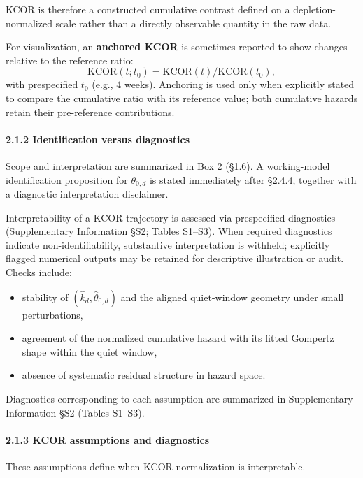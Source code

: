 \documentclass[
]{article}
\providecommand{\tightlist}{%
  \setlength{\itemsep}{0pt}\setlength{\parskip}{0pt}}
\begin{document}
KCOR is therefore a constructed cumulative contrast defined on a depletion-normalized scale rather than a directly observable quantity in the raw data.

For visualization, an \textbf{anchored KCOR} is sometimes reported to show changes relative to the reference ratio: \[\mathrm{KCOR}(t; t_0) = \mathrm{KCOR}(t)/\mathrm{KCOR}(t_0),\] with prespecified \(t_0\) (e.g., 4 weeks). Anchoring is used only when explicitly stated to compare the cumulative ratio with its reference value; both cumulative hazards retain their pre-reference contributions.

\paragraph{2.1.2 Identification versus diagnostics}\label{identification-versus-diagnostics}

Scope and interpretation are summarized in Box 2 (§1.6). A working-model identification proposition for \(\theta_{0,d}\) is stated immediately after §2.4.4, together with a diagnostic interpretation disclaimer.

Interpretability of a KCOR trajectory is assessed via prespecified diagnostics (Supplementary Information §S2; Tables S1--S3). When required diagnostics indicate non-identifiability, substantive interpretation is withheld; explicitly flagged numerical outputs may be retained for descriptive illustration or audit. Checks include:

\begin{itemize}
\tightlist
\item
  stability of \((\hat{k}_d,\hat{\theta}_{0,d})\) and the aligned quiet-window geometry under small perturbations,
\item
  agreement of the normalized cumulative hazard with its fitted Gompertz shape within the quiet window,
\item
  absence of systematic residual structure in hazard space.
\end{itemize}

Diagnostics corresponding to each assumption are summarized in Supplementary Information §S2 (Tables S1--S3).

\paragraph{2.1.3 KCOR assumptions and diagnostics}\label{kcor-assumptions-and-diagnostics}

These assumptions define when KCOR normalization is interpretable.
\end{document}
